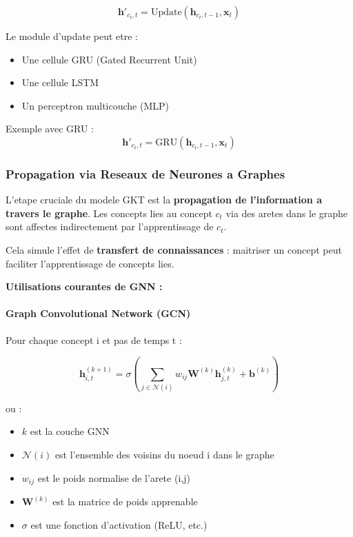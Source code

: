\documentclass[11pt, a4paper]{article}
\begin{document}
\begin{equation}
    \mathbf{h}'_{c_t,t} = \text{Update}(\mathbf{h}_{c_t,t-1}, \mathbf{x}_t)
\end{equation}

Le module d'update peut etre :
\begin{itemize}
    \item Une cellule GRU (Gated Recurrent Unit)
    \item Une cellule LSTM
    \item Un perceptron multicouche (MLP)
\end{itemize}

Exemple avec GRU :
\begin{equation}
    \mathbf{h}'_{c_t,t} = \text{GRU}(\mathbf{h}_{c_t,t-1}, \mathbf{x}_t)
\end{equation}

\subsubsection{Propagation via Reseaux de Neurones a Graphes}

L'etape cruciale du modele GKT est la \textbf{propagation de l'information a travers le graphe}. Les concepts lies au concept $c_t$ via des aretes dans le graphe sont affectes indirectement par l'apprentissage de $c_t$.

Cela simule l'effet de \textbf{transfert de connaissances} : maitriser un concept peut faciliter l'apprentissage de concepts lies.

\textbf{Utilisations courantes de GNN :}

\paragraph{Graph Convolutional Network (GCN)}

Pour chaque concept i et pas de temps t :

\begin{equation}
    \mathbf{h}_{i,t}^{(k+1)} = \sigma\left(\sum_{j \in \mathcal{N}(i)} w_{ij} \mathbf{W}^{(k)} \mathbf{h}_{j,t}^{(k)} + \mathbf{b}^{(k)}\right)
\end{equation}

ou :
\begin{itemize}
    \item $k$ est la couche GNN
    \item $\mathcal{N}(i)$ est l'ensemble des voisins du noeud i dans le graphe
    \item $w_{ij}$ est le poids normalise de l'arete (i,j)
    \item $\mathbf{W}^{(k)}$ est la matrice de poids apprenable
    \item $\sigma$ est une fonction d'activation (ReLU, etc.)
\end{itemize}
\end{document}
